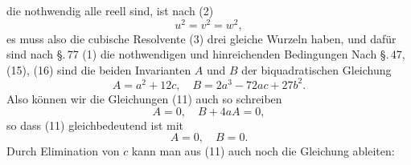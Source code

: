 %
 die nothwendig alle reell sind, ist nach (2)
\[
u^2 = v^2 = w^2,
\]
es muss also die cubische Resolvente (3) drei gleiche Wurzeln haben, und dafür sind nach \S.\,77 (1) die nothwendigen und hinreichenden Bedingungen
Nach \S.\,47, (15), (16) sind die beiden Invarianten $A$ und $B$ der biquadratischen Gleichung
\[
A = a^2+12c, \quad B = 2a^3-72ac+27b^2.
\]
Also können wir die Gleichungen (11) auch so schreiben
\[
A = 0, \quad B+4aA = 0,
\]
so dass (11) gleichbedeutend ist mit
\[
A = 0, \quad B = 0.
\]
Durch Elimination von $c$ kann man aus (11) auch noch die Gleichung ableiten:
